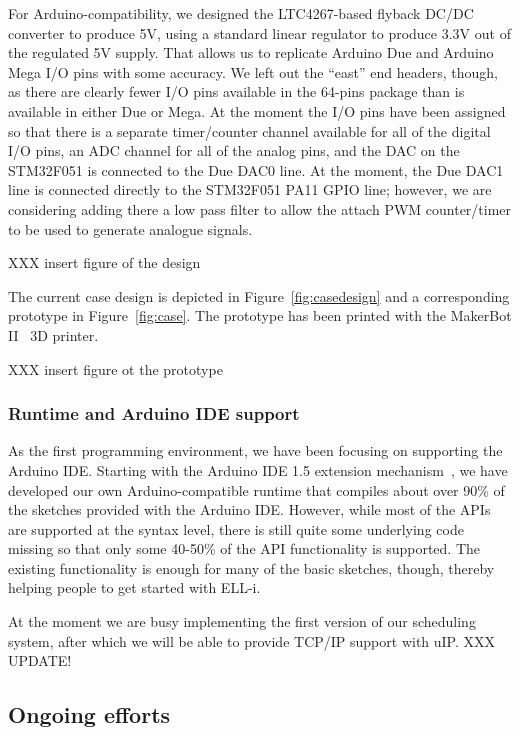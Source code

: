 \documentclass[draft,a4paper]{siamltex}
\begin{document}
For Arduino-compatibility, we designed the LTC4267-based flyback DC/DC
converter to produce 5V, using a standard linear regulator to produce
3.3V out of the regulated 5V supply.  That allows us to replicate
Arduino Due and Arduino Mega I/O pins with some accuracy.  We left out
the ``east'' end headers, though, as there are clearly fewer I/O pins
available in the 64-pins package than is available in either Due or
Mega.  At the moment the I/O pins have been assigned so that there is
a separate timer/counter channel available for all of the digital I/O
pins, an ADC channel for all of the analog pins, and the DAC on the
STM32F051 is connected to the Due DAC0 line.  At the moment, the Due
DAC1 line is connected directly to the STM32F051 PA11 GPIO line;
however, we are considering adding there a low pass filter to allow
the attach PWM counter/timer to be used to generate analogue signals.

XXX insert figure of the design

The current case design is depicted in Figure~\ref{fig:casedesign} and
a corresponding prototype in Figure~\ref{fig:case}.  The prototype has
been printed with the MakerBot II~\cite{MakerBotII} 3D printer.

XXX insert figure ot the prototype

\subsubsection{Runtime and Arduino IDE support}

As the first programming environment, we have been focusing on
supporting the Arduino IDE.  Starting with the Arduino IDE 1.5
extension mechanism~\cite{ArduinoIDEextension}, we have developed our
own Arduino-compatible runtime that compiles about over 90\% of the
sketches provided with the Arduino IDE.  However, while most of the
APIs are supported at the syntax level, there is still quite some
underlying code missing so that only some 40-50\% of the API
functionality is supported.  The existing functionality is enough for
many of the basic sketches, though, thereby helping people to get
started with ELL-i.

At the moment we are busy implementing the first version of our
scheduling system, after which we will be able to provide TCP/IP
support with uIP.  XXX UPDATE!

\subsection{Ongoing efforts}
\end{document}
